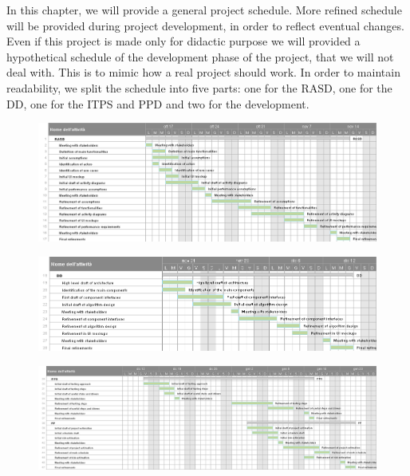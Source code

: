 In this chapter, we will provide a general project schedule. More refined schedule will be provided during project development, in order to reflect eventual changes. Even if this project is made only for didactic purpose we will provided a hypothetical schedule of the development phase of the project, that we will not deal with.  This is to mimic how a real project should work.
In order to maintain readability, we split the schedule into five parts: one for the RASD, one for the DD, one for the ITPS and PPD and two for the development.
\begin{figure}
	\centering
	\includegraphics[width=\textwidth,height=\dimexpr\textheight-4\baselineskip-\abovecaptionskip-\belowcaptionskip\relax,keepaspectratio]{schedule/RASD.png}
\end{figure}
\begin{figure}
	\centering
	\includegraphics[width=\textwidth,height=\dimexpr\textheight-4\baselineskip-\abovecaptionskip-\belowcaptionskip\relax,keepaspectratio]{schedule/DD.png}
\end{figure}
\begin{figure}
	\centering
	\includegraphics[width=\textwidth,height=\dimexpr\textheight-4\baselineskip-\abovecaptionskip-\belowcaptionskip\relax,keepaspectratio]{schedule/ITDP_PP.png}
\end{figure}
